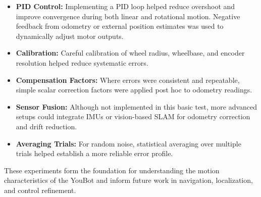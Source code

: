 \documentclass[a4paper, 12pt]{article}
\begin{document}
    \begin{itemize}
        \item \textbf{PID Control:} Implementing a PID loop helped reduce overshoot and improve convergence during both linear and rotational motion. Negative feedback from odometry or external position estimates was used to dynamically adjust motor outputs.

        \item \textbf{Calibration:} Careful calibration of wheel radius, wheelbase, and encoder resolution helped reduce systematic errors.

        \item \textbf{Compensation Factors:} Where errors were consistent and repeatable, simple scalar correction factors were applied post hoc to odometry readings.

        \item \textbf{Sensor Fusion:} Although not implemented in this basic test, more advanced setups could integrate IMUs or vision-based SLAM for odometry correction and drift reduction.

        \item \textbf{Averaging Trials:} For random noise, statistical averaging over multiple trials helped establish a more reliable error profile.
    \end{itemize}

    These experiments form the foundation for understanding the motion characteristics of the YouBot and inform future work in navigation, localization, and control refinement.
    \pagebreak
\end{document}
